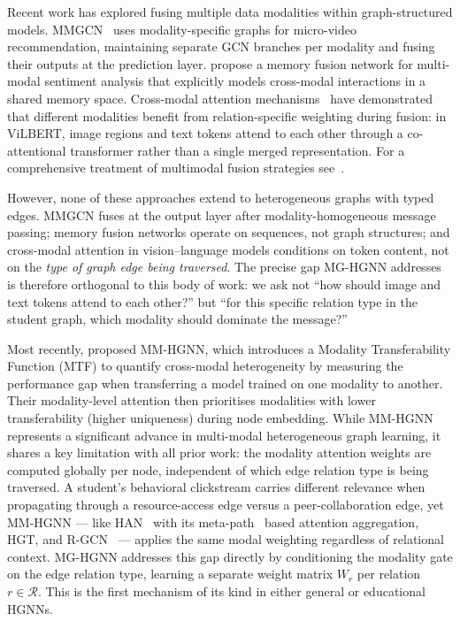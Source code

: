 \documentclass[sigconf]{acmart}
\begin{document}
Recent work has explored fusing multiple data modalities
within graph-structured models.
MMGCN~\citep{wei2019mmgcn} uses modality-specific graphs
for micro-video recommendation, maintaining separate
GCN branches per modality and fusing their outputs at
the prediction layer.
\citet{zadeh2018multimodal} propose a memory fusion
network for multi-modal sentiment analysis that
explicitly models cross-modal interactions in a shared
memory space.
Cross-modal attention mechanisms~\citep{lu2019vilbert}
have demonstrated that different modalities benefit from
relation-specific weighting during fusion: in ViLBERT,
image regions and text tokens attend to each other
through a co-attentional transformer rather than a
single merged representation.
For a comprehensive treatment of multimodal
fusion strategies see~\citep{xu2023multimodal}.

However, none of these approaches extend to
heterogeneous graphs with typed edges. MMGCN fuses at
the output layer after modality-homogeneous message
passing; memory fusion networks operate on sequences,
not graph structures; and cross-modal attention in
vision--language models conditions on token content,
not on the \emph{type of graph edge being traversed}.
The precise gap MG-HGNN addresses is therefore
orthogonal to this body of work: we ask not ``how
should image and text tokens attend to each other?''
but ``for this specific relation type in the student
graph, which modality should dominate the message?''

Most recently, \citet{bachiri2025mmhgnn} proposed
MM-HGNN, which introduces a Modality Transferability
Function (MTF) to quantify cross-modal heterogeneity
by measuring the performance gap when transferring a
model trained on one modality to another. Their
modality-level attention then prioritises modalities
with lower transferability (higher uniqueness) during
node embedding. While MM-HGNN represents a significant
advance in multi-modal heterogeneous graph learning, it
shares a key limitation with all prior work: the
modality attention weights are computed globally per
node, independent of which edge relation type is being
traversed. A student's behavioral clickstream carries
different relevance when propagating through a
resource-access edge versus a peer-collaboration edge,
yet MM-HGNN --- like HAN~\citep{wang2019heterogeneous}
with its meta-path~\citep{sun2011pathsim} based
attention aggregation, HGT, and
R-GCN~\citep{schlichtkrull2018modeling} --- applies the
same modal weighting regardless of relational context.
MG-HGNN addresses this gap directly by conditioning
the modality gate on the edge relation type, learning
a separate weight matrix $W_r$ per relation $r
\in \mathcal{R}$. This is the first mechanism of its
kind in either general or educational HGNNs.
\end{document}

